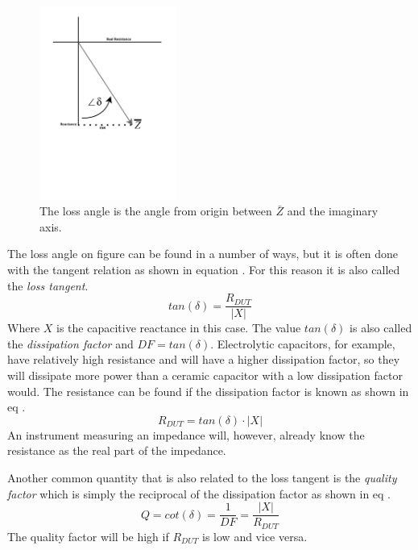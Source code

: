 \begin{figure}[H]
    \centering
    \includegraphics[clip, trim=0 275 0 0, width=0.4\textwidth]{Sections/4_TechnicalAnalysis/Figures/4_1_4_LossTangent2.pdf}
    \caption{The loss angle is the angle from origin between $\bar Z$ and the imaginary axis.}
    \label{fig:4_1_1_LossTangent2}
\end{figure}

The loss angle on figure  can be found in a number of ways, but it is often done with the tangent relation as shown in equation . For this reason it is also called the \textit{loss tangent}.
\begin{equation}\label{eq:4_1_1_LossAngle}
    tan(\delta) =\frac{R_{DUT}}{|X|} 
\end{equation}
Where $X$ is the capacitive reactance in this case. The value $tan(\delta)$ is also called the \textit{dissipation factor} and $DF = tan(\delta)$. Electrolytic capacitors, for example, have relatively high resistance and will have a higher dissipation factor, so they will dissipate more power than a ceramic capacitor with a low dissipation factor would. The resistance can be found if the dissipation factor is known as shown in eq .
\begin{equation}\label{eq:4_1_1_ESR}
    R_{DUT} =  tan(\delta)\cdot |X|
\end{equation}
An instrument measuring an impedance will, however, already know the resistance as the real part of the impedance.

Another common quantity that is also related to the loss tangent is the \textit{quality factor} which is simply the reciprocal of the dissipation factor as shown in eq .
\begin{equation}\label{eq:4_1_1_Q}
    Q = cot(\delta) = \frac{1}{DF} = \frac{|X|}{R_{DUT}}
\end{equation}
The quality factor will be high if $R_{DUT}$ is low and vice versa.



